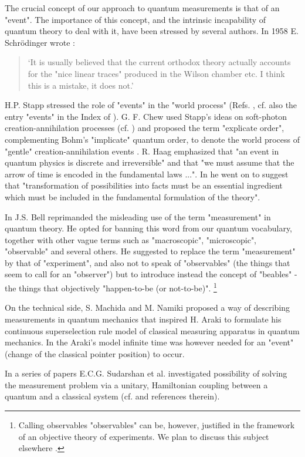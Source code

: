 \documentclass[12pt]{article}
\begin{document}
The crucial concept of our approach to quantum measurements is that of an
"event". The importance of this concept, and the intrinsic incapability of
quantum theory to deal with it, have been stressed by several authors. In
1958 E. Schr\"odinger wrote \cite{sch1}:
\begin{quotation} \lq It is usually believed that the current orthodox
theory actually accounts for the "nice linear traces" produced in the
Wilson chamber etc. I think this is a mistake, it does not.\rq
\end{quotation}
H.P. Stapp stressed the role of "events" in the "world process" (Refs.
\cite{stap2,stap3}, cf. also the entry "events" in the Index of
\cite{stap4}). G. F. Chew used Stapp's ideas on soft-photon
creation-annihilation processes (cf. \cite{stap5}) and proposed the term
"explicate order", complementing Bohm's "implicate" quantum order, to
denote the world process of "gentle" creation-annihilation events
\cite{chew1}. R. Haag emphasized \cite{haag1} that "an event in quantum
physics is discrete and irreversible" and that "we must assume that the
arrow of time is encoded in the fundamental laws ...". In \cite{haag2} he
went on to suggest that "transformation of possibilities into facts must be
an essential ingredient which must be included in the fundamental
formulation of the theory".

In \cite{bel1,bel2} J.S. Bell reprimanded the misleading use of the term
"measurement" in quantum theory. He opted for banning this word from our
quantum vocabulary, together with other vague terms such as "macroscopic",
"microscopic", "observable" and several others. He suggested to replace the
term "measurement" by that of "experiment", and also not to speak of
"observables" (the things that seem to call for an "observer") but to
introduce instead the concept of "beables" - the things that objectively
"happen-to-be (or not-to-be)". \footnote{Calling observables
"observables" can be, however, justified in the framework of an objective
theory of experiments. We plan to discuss this subject elsewhere .}

On the technical side, S. Machida and M. Namiki \cite{mach1} proposed a way
of describing measurements in quantum mechanics that inspired H. Araki
\cite{ara1,ara2} to formulate his continuous superselection rule model of
classical measuring apparatus in quantum mechanics. In the Araki's model
infinite time was however needed for an "event" (change of the classical
pointer position) to occur.

In a series of papers E.C.G. Sudarshan et al.  investigated possibility
of solving the measurement problem via a unitary, Hamiltonian
coupling between a quantum and a classical system (cf. \cite{su1} and
references therein).
\end{document}
